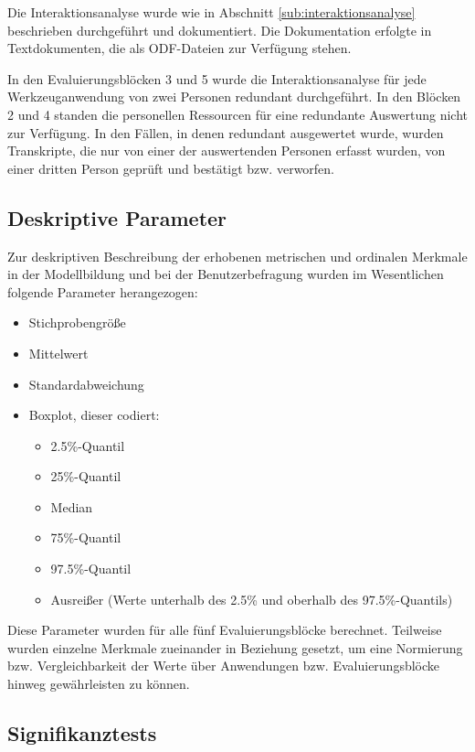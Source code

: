 Die Interaktionsanalyse wurde wie in Abschnitt \ref{sub:interaktionsanalyse} beschrieben durchgeführt und dokumentiert. Die Dokumentation erfolgte in Textdokumenten, die als \gls{ODF}-Dateien zur Verfügung stehen.

In den Evaluierungsblöcken 3 und 5 wurde die Interaktionsanalyse für jede Werkzeuganwendung von zwei Personen redundant durchgeführt. In den Blöcken 2 und 4 standen die personellen Ressourcen für eine redundante Auswertung nicht zur Verfügung. In den Fällen, in denen redundant ausgewertet wurde, wurden Transkripte, die nur von einer der auswertenden Personen erfasst wurden, von einer dritten Person geprüft und bestätigt bzw. verworfen.

\subsection{Deskriptive Parameter} %
\label{sub:deskriptive_parameter}

Zur deskriptiven Beschreibung der erhobenen metrischen und ordinalen Merkmale in der Modellbildung und bei der Benutzerbefragung wurden im Wesentlichen folgende Parameter herangezogen:

\begin{itemize}
	\item Stichprobengröße
	\item Mittelwert
	\item Standardabweichung
	\item Boxplot, dieser codiert:
		\begin{itemize}
			\item 2.5\%-Quantil
			\item 25\%-Quantil
			\item Median
			\item 75\%-Quantil
			\item 97.5\%-Quantil
			\item Ausreißer (Werte unterhalb des 2.5\% und oberhalb des 97.5\%-Quantils)
		\end{itemize}
\end{itemize}

Diese Parameter wurden für alle fünf Evaluierungsblöcke berechnet. Teilweise wurden einzelne Merkmale zueinander in Beziehung gesetzt, um eine Normierung bzw. Vergleichbarkeit der Werte über Anwendungen bzw. Evaluierungsblöcke hinweg gewährleisten zu können.

\subsection{Signifikanztests} %
\label{sub:signifikanztests_fb2}

